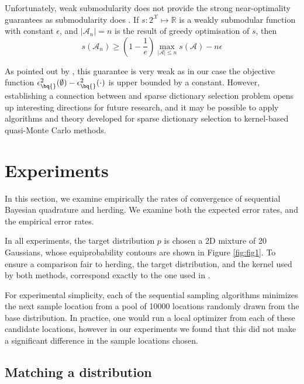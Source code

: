 Unfortunately, weak submodularity does not provide the strong near-optimality guarantees as submodularity does . If $s:2^\mathcal{X} \mapsto \mathbb{R}$ is a weakly submodular function with constant $\epsilon$, and $\vert\mathcal{A}_n\vert=n$ is the result of greedy optimisation of $s$, then
\begin{equation}
	s(\mathcal{A}_n) \geq \left(1-\frac{1}{e}\right)\max_{\vert\mathcal{A}\vert\leq n}s(\mathcal{A}) - n\epsilon
\end{equation}

As pointed out by \citet{KrauseCevher10}, this guarantee is very weak as in our case the objective function $\epsilon^{2}_{\bq{}}(\emptyset)-\epsilon^{2}_{\bq{}}(\cdot)$ is upper bounded by a constant. However, establishing a connection between \sbq{} and sparse dictionary selection problem opens up interesting directions for future research, and it may be possible to apply algorithms and theory developed for sparse dictionary selection to kernel-based quasi-Monte Carlo methods.

\section{Experiments}\label{sec:herding_experiments}

In this section, we examine empirically the rates of convergence of sequential Bayesian quadrature and herding. We examine both the expected error rates, and the empirical error rates.

In all experiments, the target distribution $p$ is chosen a 2D mixture of 20 Gaussians, whose equiprobability contours are shown in Figure \ref{fig:fig1}. To ensure a comparison fair to herding, the target distribution, and the kernel used by both methods, correspond exactly to the one used in \citep[Fig. 1]{chen2010super}. %

For experimental simplicity, each of the sequential sampling algorithms minimizes the next sample location from a pool of 10000 locations randomly drawn from the base distribution. In practice, one would run a local optimizer from each of these candidate locations, however in our experiments we found that this did not make a significant difference in the sample locations chosen. 

\subsection{Matching a distribution}

